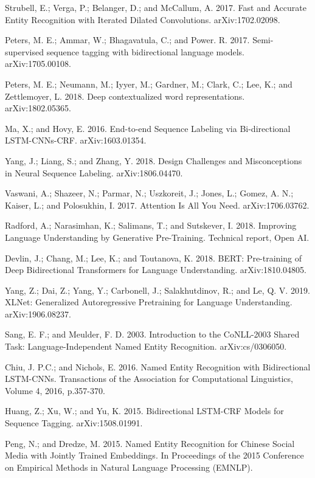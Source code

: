 \documentclass[letterpaper]{article} %
\begin{document}
\smallskip \noindent
Strubell, E.; Verga, P.; Belanger, D.; and McCallum, A. 2017. Fast and Accurate Entity Recognition with Iterated Dilated Convolutions. arXiv:1702.02098. 

\smallskip \noindent
Peters, M. E.; Ammar, W.; Bhagavatula, C.; and Power. R.  2017. Semi-supervised sequence tagging with bidirectional language models. arXiv:1705.00108.

\smallskip \noindent 
Peters, M. E.; Neumann, M.; Iyyer, M.; Gardner, M.; Clark, C.; Lee, K.; and Zettlemoyer, L. 2018. Deep contextualized word representations. arXiv:1802.05365. 

\smallskip \noindent
Ma, X.; and Hovy, E. 2016. End-to-end Sequence Labeling via Bi-directional LSTM-CNNs-CRF. arXiv:1603.01354. 

\smallskip \noindent
Yang, J.; Liang, S.; and Zhang, Y. 2018. Design Challenges and Misconceptions in Neural Sequence Labeling. arXiv:1806.04470. 

\smallskip \noindent
Vaswani, A.; Shazeer, N.; Parmar, N.; Uszkoreit, J.; Jones, L.; Gomez, A. N.; Kaiser, L.; and Polosukhin, I. 2017. Attention Is All You Need. arXiv:1706.03762. 

\smallskip \noindent
Radford, A.; Narasimhan, K.; Salimans, T.; and Sutskever, I. 2018. Improving Language Understanding by Generative Pre-Training. Technical report, Open AI.

\smallskip \noindent
Devlin, J.; Chang, M.; Lee, K.; and Toutanova, K. 2018. BERT: Pre-training of Deep Bidirectional Transformers for Language Understanding. arXiv:1810.04805.

\smallskip \noindent
Yang, Z.; Dai, Z.; Yang, Y.; Carbonell, J.; Salakhutdinov, R.; and Le, Q. V. 2019. XLNet: Generalized Autoregressive Pretraining for Language Understanding. arXiv:1906.08237.

\smallskip \noindent
Sang, E. F.; and Meulder, F. D. 2003. Introduction to the CoNLL-2003 Shared Task: Language-Independent Named Entity Recognition. arXiv:cs/0306050. 

\smallskip \noindent
Chiu, J. P.C.; and Nichols, E. 2016. Named Entity Recognition with Bidirectional LSTM-CNNs. Transactions of the Association for Computational Linguistics, Volume 4, 2016, p.357-370. 

\smallskip \noindent
Huang, Z.; Xu, W.; and Yu, K. 2015. Bidirectional LSTM-CRF Models for Sequence Tagging. arXiv:1508.01991. 

\smallskip \noindent
Peng, N.; and Dredze, M. 2015. Named Entity Recognition for Chinese Social Media with Jointly Trained Embeddings. In Proceedings of the 2015 Conference on Empirical Methods in Natural Language Processing (EMNLP). 
\end{document}
